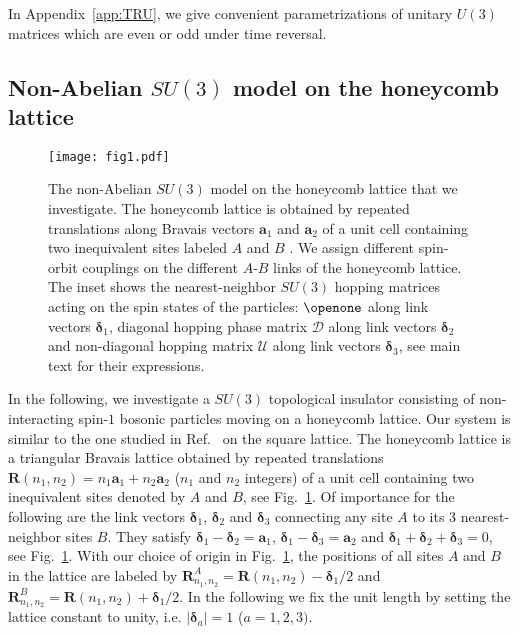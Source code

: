 \documentclass[aps,pra,showpacs,twocolumn,superscriptaddress]{revtex4-1}
\begin{document}
In Appendix~\ref{app:TRU}, we give convenient parametrizations of unitary $U(3)$ 
matrices which are even or odd under time reversal. 




\subsection{Non-Abelian $SU(3)$ model on the honeycomb lattice}

\begin{figure}[t!p]
	\texttt{[image: fig1.pdf]}
	\caption{\label{fig:model}The non-Abelian $SU(3)$ model on the honeycomb lattice that we investigate. 
	The honeycomb lattice is obtained by repeated translations along Bravais vectors $\mathbf{a}_1$ and $\mathbf{a}_2$ 
	of a unit cell containing two inequivalent sites labeled $A$ and $B$ .
	We assign different spin-orbit couplings on the different $A$-$B$ links of the honeycomb lattice. 
	The inset shows the nearest-neighbor $SU(3)$ hopping matrices acting on the spin states of the particles: 
	$\openone$ along link vectors $\bm{\delta}_1$, diagonal hopping phase matrix $\mathcal{D}$ 
	along link vectors $\bm{\delta}_2$ and non-diagonal hopping matrix $\mathcal{U}$ along 
	link vectors $\bm{\delta}_3$, see main text for their expressions. }
\end{figure}


In the following, we investigate a $SU(3)$ topological insulator consisting of non-interacting  
spin-$1$ bosonic particles moving on a honeycomb lattice. Our system is similar to the one studied in 
Ref.~\cite{Barnett2012} on the square lattice. The honeycomb lattice is a triangular Bravais lattice 
obtained by repeated translations $\mathbf{R}(n_1,n_2)=n_1\mathbf{a}_1+n_2\mathbf{a}_2$ ($n_1$ and $n_2$ integers) 
of a unit cell containing two inequivalent sites denoted by $A$ and $B$, see Fig.~\ref{fig:model}. 
Of importance for the following are the link vectors $\bm{\delta}_1$, $\bm{\delta}_2$ and $\bm{\delta}_3$ 
connecting any site $A$ to its 3 nearest-neighbor sites $B$. They satisfy $\bm{\delta}_1-\bm{\delta}_2 = 
\mathbf{a}_1$, $\bm{\delta}_1-\bm{\delta}_3 = \mathbf{a}_2$ and $\bm{\delta}_1 + \bm{\delta}_2 +\bm{\delta}_3=0$, 
see Fig.~\ref{fig:model}. With our choice of origin in Fig.~\ref{fig:model}, 
the positions of all sites $A$ and $B$ in the lattice are labeled by 
$\mathbf{R}^A_{n_1,n_2} = \mathbf{R}(n_1,n_2)-\bm{\delta}_1/2$ and 
$\mathbf{R}^B_{n_1,n_2} = \mathbf{R}(n_1,n_2) + \bm{\delta}_1/2$. 
In the following we fix the unit length by setting the lattice constant to unity, i.e. $|\bm{\delta}_a|=1$ ($a=1,2,3)$. 
 
\end{document}
